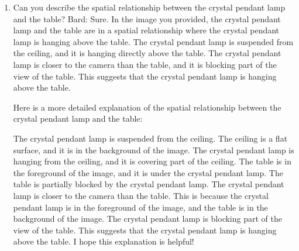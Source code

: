 \begin{enumerate}
    \item Can you describe the spatial relationship between the crystal pendant lamp and the table?
    \subitem 
    Bard: 
    Sure. In the image you provided, the crystal pendant lamp and the table are in a spatial relationship where the crystal pendant lamp is hanging above the table. The crystal pendant lamp is suspended from the ceiling, and it is hanging directly above the table. The crystal pendant lamp is closer to the camera than the table, and it is blocking part of the view of the table. This suggests that the crystal pendant lamp is hanging above the table.
    
    Here is a more detailed explanation of the spatial relationship between the crystal pendant lamp and the table:
    
    The crystal pendant lamp is suspended from the ceiling. The ceiling is a flat surface, and it is in the background of the image. The crystal pendant lamp is hanging from the ceiling, and it is covering part of the ceiling.
    The table is in the foreground of the image, and it is under the crystal pendant lamp. The table is partially blocked by the crystal pendant lamp.
    The crystal pendant lamp is closer to the camera than the table. This is because the crystal pendant lamp is in the foreground of the image, and the table is in the background of the image.
    The crystal pendant lamp is blocking part of the view of the table. This suggests that the crystal pendant lamp is hanging above the table.
    I hope this explanation is helpful!
    

\end{enumerate}
